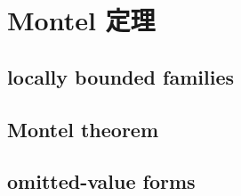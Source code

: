 \section{Montel 定理}
\label{b3:sec:0403}


\subsection{locally bounded families}
\label{b3:subsec:040301}

\subsection{Montel theorem}
\label{b3:subsec:040302}

\subsection{omitted-value forms}
\label{b3:subsec:040303}


